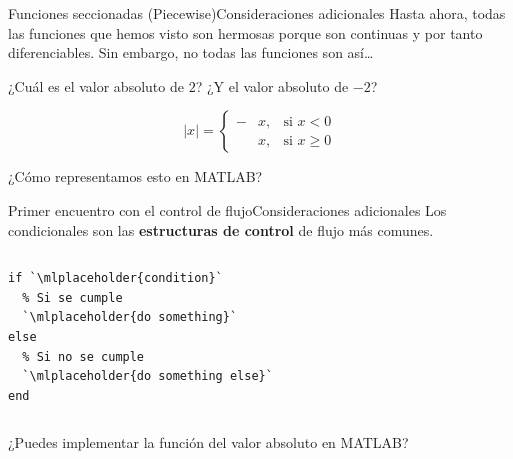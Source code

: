 \documentclass[spanish, c]{beamer}
\begin{document}
\begin{frame}{Funciones seccionadas (Piecewise)}{Consideraciones adicionales}
    Hasta ahora, todas las funciones que hemos visto son hermosas porque son continuas y por tanto diferenciables.
    Sin embargo, no todas las funciones son así\dots \pause

    \bigskip

    ¿Cuál es el valor absoluto de $2$? \pause ¿Y el valor absoluto de $-2$? \pause

    $$|x| =\left\{ \begin{aligned}
        -&x , &\text{si } x < 0 \\
        &x ,  & \text{si } x \ge 0
    \end{aligned} \right.
    $$ \pause
    
    \bigskip

    ¿Cómo representamos esto en MATLAB?
\end{frame}

\begin{frame}[fragile]{Primer encuentro con el control de flujo}{Consideraciones adicionales}
    Los \alert{condicionales} son las \textbf{estructuras de control} de flujo más comunes.

    \bigskip

    \begin{columns}
        \begin{column}{0.95\linewidth}
\begin{lstlisting}
if `\mlplaceholder{condition}`
  % Si se cumple
  `\mlplaceholder{do something}`
else
  % Si no se cumple
  `\mlplaceholder{do something else}`
end
\end{lstlisting}
        \end{column}
        
    \end{columns}

\bigskip

¿Puedes implementar la función del valor absoluto en MATLAB?
\end{frame}




\end{document}
